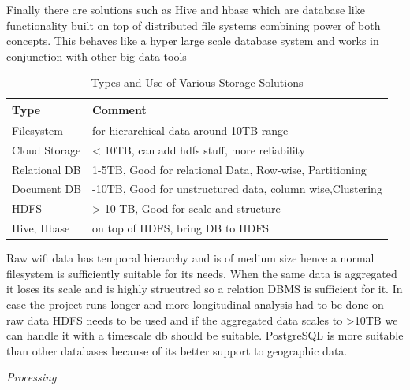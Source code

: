 Finally there are solutions such as Hive and hbase which are database like functionality built on top of distributed file systems combining power of both concepts.
This behaves like a hyper large scale database system and works in conjunction with other big data tools


\begin{table}[h]
  \footnotesize
  \begin{center}
    \begin{tabular}{ll}
      \toprule
        Type & Comment\\
      \midrule
        Filesystem & for hierarchical data around 10TB range\\
        Cloud Storage & \textless{}  10TB, can add hdfs stuff, more reliability\\
        Relational DB & 1-5TB, Good for relational Data, Row-wise, Partitioning\\
        Document DB & -10TB, Good for unstructured data, column wise,Clustering\\
        HDFS & \textgreater{} 10 TB, Good for scale and structure\\
        Hive, Hbase & on top of HDFS, bring DB to HDFS\\
      \bottomrule
    \end{tabular}
  \end{center}
  \caption{Types and Use of Various Storage Solutions}
  \label{table:toolkit:storage}
\end{table}


Raw wifi data has temporal hierarchy and is of medium size hence a normal filesystem is sufficiently suitable for its needs.
When the same data is aggregated it loses its scale and is highly strucutred so a relation DBMS is sufficient for it.
In case the project runs longer and more longitudinal analysis had to be done on raw data HDFS needs to be used and if the aggregated data scales to >10TB we can handle it with a timescale db should be suitable.
PostgreSQL is more suitable than other databases because of its better support to geographic data.


\vspace{1.5em}\noindent\textit{Processing}\vspace{0.5em}

